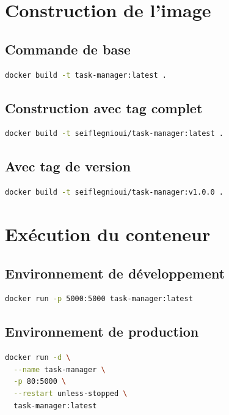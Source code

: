 \documentclass[12pt,a4paper,twoside]{report}
\begin{document}
\section{Construction de l'image}

\subsection{Commande de base}

\begin{lstlisting}[language=bash]
docker build -t task-manager:latest .
\end{lstlisting}

\subsection{Construction avec tag complet}

\begin{lstlisting}[language=bash]
docker build -t seiflegnioui/task-manager:latest .
\end{lstlisting}

\subsection{Avec tag de version}

\begin{lstlisting}[language=bash]
docker build -t seiflegnioui/task-manager:v1.0.0 .
\end{lstlisting}

\section{Exécution du conteneur}

\subsection{Environnement de développement}

\begin{lstlisting}[language=bash]
docker run -p 5000:5000 task-manager:latest
\end{lstlisting}

\subsection{Environnement de production}

\begin{lstlisting}[language=bash]
docker run -d \
  --name task-manager \
  -p 80:5000 \
  --restart unless-stopped \
  task-manager:latest
\end{lstlisting}
\end{document}
